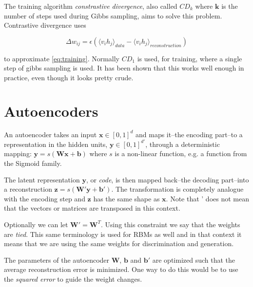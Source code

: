 \documentclass[11pt]{article}
\begin{document}
The training algorithm \textit{constrastive divergence}, also called $CD_k$ where $\mathbf{k}$ is the number of steps used during Gibbs sampling, aims to solve this problem.  Contrastive divergence uses

\begin{equation}
\label{eq:cd}
  \Delta w_{ij} = \epsilon(\langle v_ih_j\rangle_{data} - \langle v_ih_j\rangle_{reconstruction})
\end{equation}

to approximate \ref{eq:training}.  Normally $CD_1$ is used, for training, where a single step of gibbs sampling is used.  It has been shown that this works well enough in practice, even though it looks pretty crude\cite{hinton06}.

\section{Autoencoders}

An autoencoder takes an input $\mathbf{x} \in [0,1]^d$ and maps it--the encoding part--to a representation in the hidden units, $\mathbf{y} \in [0,1]^{d'}$, through a deterministic mapping:
 $\mathbf{y} = s(\mathbf{W}\mathbf{x} + \mathbf{b})$ where $s$ is a non-linear function, e.g. a function from the Sigmoid family.

The latent representation $\mathbf{y}$, or \textit{code}, is then mapped back--the decoding part--into a reconstruction $\mathbf{z} = s(\mathbf{W'}\mathbf{y} + \mathbf{b'})$.  The transformation is completely analogue with the encoding step and $\mathbf{z}$ has the same shape as $\mathbf{x}$.  Note that ' does not mean that the vectors or matrices are transposed in this context.

Optionally we can let $\mathbf{W'} = \mathbf{W}^T$.  Using this constraint we say that the weights are \textit{tied}.  This same terminology is used for RBMs as well and in that context it means that we are using the same weights for discrimination and generation.

The parameters of the autoencoder $\mathbf{W}$, $\mathbf{b}$ and $\mathbf{b'}$ are optimized such that the average reconstruction error is minimized.  One way to do this would be to use the \textit{squared error} to guide the weight changes.
\end{document}
